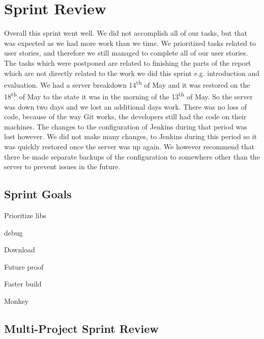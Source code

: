\chapter{Sprint Review}\label{chap:sprint4_end}
Overall this sprint went well. We did not accomplish all of our tasks, but that was expected as we had more work than we time. We prioritized tasks related to user stories, and therefore we still managed to complete all of our user stories. The tasks which were postponed are related to finishing the parts of the report which are not directly related to the work we did this sprint e.g. introduction and evaluation. We had a server breakdown 14\textsuperscript{th} of May and it was restored on the 18\textsuperscript{th} of May to the state it was in the morning of the 13\textsuperscript{th} of May. So the server was down two days and we lost an additional days work. There was no loss of code, because of the way Git works, the developers still had the code on their machines. The changes to the configuration of Jenkins during that period was lost however. We did not make many changes, to Jenkins during this period so it was quickly restored once the server was up again. We however recommend that there be made separate backups of the configuration to somewhere other than the server to prevent issues in the future.
\section{Sprint Goals}\label{sec:s4_goals}
Prioritize libs

debug

Download

Future proof

Faster build

Monkey
\section{Multi-Project Sprint Review}\label{sec:s4_multiprj_review}